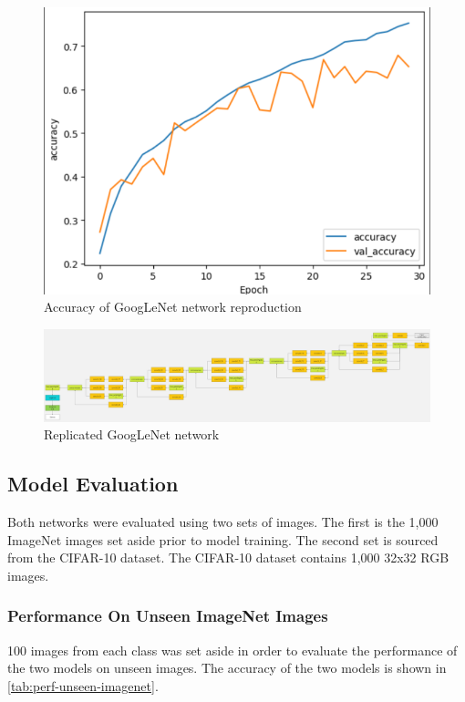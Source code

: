 \documentclass{article}
\begin{document}
\begin{figure}[ht]
    \centering
    \includegraphics[scale=0.7]{project/paper_images/googlenet_complex_accuracy.png}
    \caption{Accuracy of GoogLeNet network reproduction}
    \label{fig:googlenet-complex-accuracy}
\end{figure}

\begin{figure}[ht]
    \centering
    \includegraphics[width=\textwidth]{project/paper_images/googlenet_complex.png}
    \caption{Replicated GoogLeNet network}
    \label{fig:googlenet-complex}
\end{figure}

\subsection{Model Evaluation}
Both networks were evaluated using two sets of images. The first is the 1,000 ImageNet images set aside prior to model training. The second set is sourced from the CIFAR-10 dataset\cite{kim_cifar10_images}. The CIFAR-10 dataset contains 1,000 32x32 RGB images.

\subsubsection{Performance On Unseen ImageNet Images}
100 images from each class was set aside in order to evaluate the performance of the two models on unseen images. The accuracy of the two models is shown in \ref{tab:perf-unseen-imagenet}.
\end{document}
